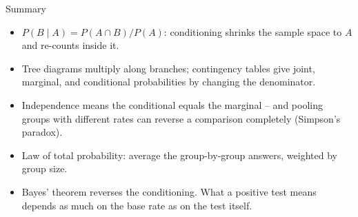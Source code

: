 \begin{frame}{Summary}
\begin{itemize}
  \item $P(B \mid A) = P(A \cap B)/P(A)$: conditioning shrinks the sample space to $A$ and re-counts inside it.
  \pause
  \item Tree diagrams multiply along branches; contingency tables give joint, marginal, and conditional probabilities by changing the denominator.
  \pause
  \item Independence means the conditional equals the marginal -- and pooling groups with different rates can reverse a comparison completely (Simpson's paradox).
  \pause
  \item Law of total probability: average the group-by-group answers, weighted by group size.
  \pause
  \item Bayes' theorem reverses the conditioning. What a positive test means depends as much on the base rate as on the test itself.
\end{itemize}
\end{frame}
